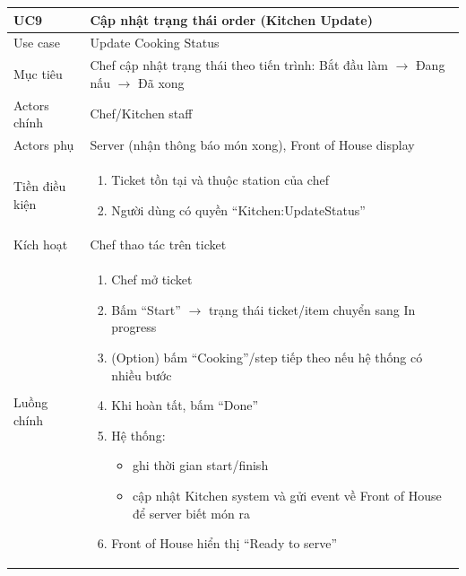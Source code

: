 \begin{longtable}{|>{\raggedright\arraybackslash}p{}|>{\raggedright\arraybackslash}p{}|}
\hline
\textbf{UC9} & \textbf{Cập nhật trạng thái order (Kitchen Update)} \\
\hline
Use case & Update Cooking Status \\
\hline
Mục tiêu & Chef cập nhật trạng thái theo tiến trình: Bắt đầu làm $\rightarrow$ Đang nấu $\rightarrow$ Đã xong \\
\hline
Actors chính & Chef/Kitchen staff \\
\hline
Actors phụ & Server (nhận thông báo món xong), Front of House display \\
\hline
Tiền điều kiện &
\vspace{-0.5em}
\begin{enumerate}[leftmargin=*]
\item Ticket tồn tại và thuộc station của chef
\item Người dùng có quyền “Kitchen:UpdateStatus”
\end{enumerate}
\vspace{-0.5em}
\\
\hline
Kích hoạt & Chef thao tác trên ticket \\
\hline
Luồng chính &
\vspace{-0.5em}
\begin{enumerate}[leftmargin=*]
\item Chef mở ticket
\item Bấm “Start” $\rightarrow$ trạng thái ticket/item chuyển sang In progress
\item (Option) bấm “Cooking”/step tiếp theo nếu hệ thống có nhiều bước
\item Khi hoàn tất, bấm “Done”
\item Hệ thống:
\vspace{-0.5em}
\begin{itemize}[leftmargin=*]
\item ghi thời gian start/finish
\item cập nhật Kitchen system và gửi event về Front of House để server biết món ra
\end{itemize}
\vspace{-0.5em}
\item Front of House hiển thị “Ready to serve”
\end{enumerate}
\vspace{-0.5em}

\end{longtable}
